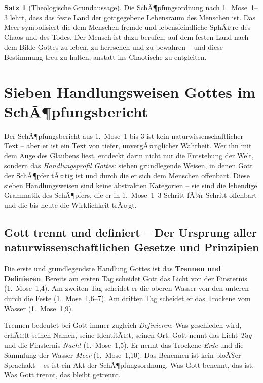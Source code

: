 ﻿\documentclass[a4paper,12pt]{article}
\theoremstyle{definition}
\newtheorem{theorem}{Satz}[section]
\begin{document}
\begin{theorem}[Theologische Grundaussage]
    Die SchÃ¶pfungsordnung nach 1.~Mose~1--3 lehrt, dass das feste Land der
    gottgegebene Lebensraum des Menschen ist. Das Meer symbolisiert die dem Menschen
    fremde und lebensfeindliche SphÃ¤re des Chaos und des Todes. Der Mensch ist
    dazu berufen, auf dem festen Land nach dem Bilde Gottes zu leben, zu herrschen
    und zu bewahren -- und diese Bestimmung treu zu halten, anstatt ins Chaotische
    zu entgleiten.
\end{theorem}

\section{Sieben Handlungsweisen Gottes im SchÃ¶pfungsbericht}

Der SchÃ¶pfungsbericht aus 1.~Mose~1 bis 3 ist kein naturwissenschaftlicher Text --
aber er ist ein Text von tiefer, unvergÃ¤nglicher Wahrheit. Wer ihn mit dem Auge
des Glaubens liest, entdeckt darin nicht nur die Entstehung der Welt, sondern das
\textit{Handlungsprofil Gottes}: sieben grundlegende Weisen, in denen Gott der
SchÃ¶pfer tÃ¤tig ist und durch die er sich dem Menschen offenbart. Diese sieben
Handlungsweisen sind keine abstrakten Kategorien -- sie sind die lebendige
Grammatik des SchÃ¶pfers, die er in 1.~Mose~1--3 Schritt fÃ¼r Schritt offenbart
und die bis heute die Wirklichkeit trÃ¤gt.

\subsection{Gott trennt und definiert -- Der Ursprung aller naturwissenschaftlichen
	Gesetze und Prinzipien}

Die erste und grundlegendste Handlung Gottes ist das \textbf{Trennen und Definieren}.
Bereits am ersten Tag scheidet Gott das Licht von der Finsternis (1.~Mose~1,4).
Am zweiten Tag scheidet er die oberen Wasser von den unteren durch die Feste
(1.~Mose~1,6--7). Am dritten Tag scheidet er das Trockene vom Wasser (1.~Mose~1,9).

Trennen bedeutet bei Gott immer zugleich \textit{Definieren}: Was geschieden wird,
erhÃ¤lt seinen Namen, seine IdentitÃ¤t, seinen Ort. Gott nennt das Licht \textit{Tag}
und die Finsternis \textit{Nacht} (1.~Mose~1,5). Er nennt das Trockene
\textit{Erde} und die Sammlung der Wasser \textit{Meer} (1.~Mose~1,10). Das
Benennen ist kein bloÃŸer Sprachakt -- es ist ein Akt der SchÃ¶pfungsordnung. Was
Gott benennt, das ist. Was Gott trennt, das bleibt getrennt.
\end{document}
